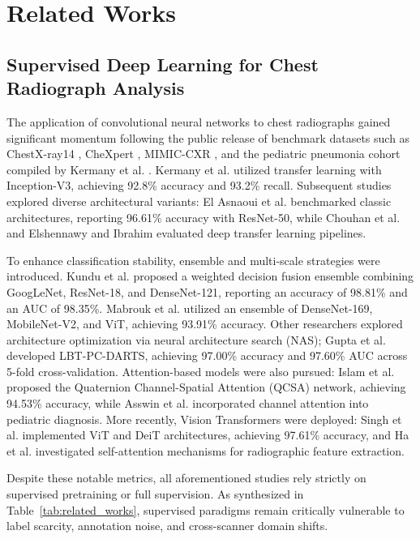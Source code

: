 \documentclass[journal,article,submit,moreauthors,pdftex]{Definitions/tsp}
\begin{document}
\section{Related Works} \label{sect:s2}

\subsection{Supervised Deep Learning for Chest Radiograph Analysis}
The application of convolutional neural networks to chest radiographs gained significant momentum following the public release of benchmark datasets such as ChestX-ray14 \cite{Wang17}, CheXpert \cite{Irvin19}, MIMIC-CXR \cite{Johnson19}, and the pediatric pneumonia cohort compiled by Kermany et al. \cite{Kermany18}. Kermany et al. utilized transfer learning with Inception-V3, achieving 92.8\% accuracy and 93.2\% recall. Subsequent studies explored diverse architectural variants: El Asnaoui et al. \cite{ElAsnaoui21} benchmarked classic architectures, reporting 96.61\% accuracy with ResNet-50, while Chouhan et al. \cite{Chouhan20} and Elshennawy and Ibrahim \cite{Elshennawy20} evaluated deep transfer learning pipelines.

To enhance classification stability, ensemble and multi-scale strategies were introduced. Kundu et al. \cite{Kundu21} proposed a weighted decision fusion ensemble combining GoogLeNet, ResNet-18, and DenseNet-121, reporting an accuracy of 98.81\% and an AUC of 98.35\%. Mabrouk et al. \cite{Mabrouk22} utilized an ensemble of DenseNet-169, MobileNet-V2, and ViT, achieving 93.91\% accuracy. Other researchers explored architecture optimization via neural architecture search (NAS); Gupta et al. \cite{Gupta22} developed LBT-PC-DARTS, achieving 97.00\% accuracy and 97.60\% AUC across 5-fold cross-validation. Attention-based models were also pursued: Islam et al. \cite{Singh23} proposed the Quaternion Channel-Spatial Attention (QCSA) network, achieving 94.53\% accuracy, while Asswin et al. \cite{Asswin23} incorporated channel attention into pediatric diagnosis. More recently, Vision Transformers were deployed: Singh et al. \cite{Singh24} implemented ViT and DeiT architectures, achieving 97.61\% accuracy, and Ha et al. \cite{Ha23} investigated self-attention mechanisms for radiographic feature extraction.

Despite these notable metrics, all aforementioned studies rely strictly on supervised pretraining or full supervision. As synthesized in Table~\ref{tab:related_works}, supervised paradigms remain critically vulnerable to label scarcity, annotation noise, and cross-scanner domain shifts.
\end{document}
